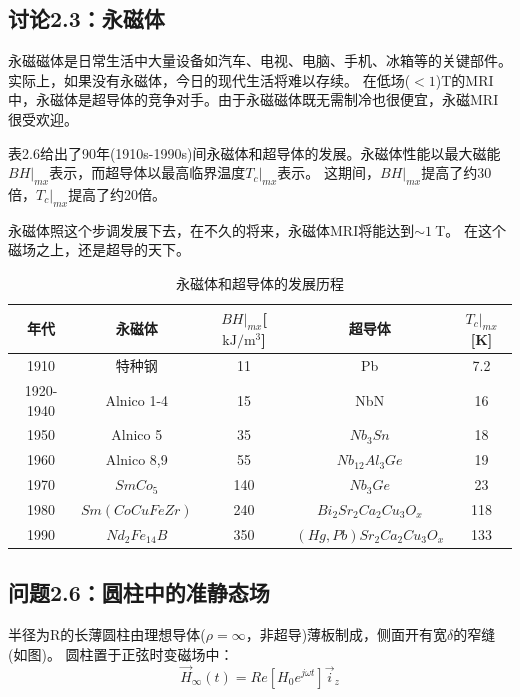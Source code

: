 \subsection{讨论2.3：永磁体}
永磁磁体是日常生活中大量设备如汽车、电视、电脑、手机、冰箱等的关键部件。实际上，如果没有永磁体，今日的现代生活将难以存续。
在低场($<1$)T的MRI中，永磁体是超导体的竞争对手。由于永磁磁体既无需制冷也很便宜，永磁MRI很受欢迎。

表2.6给出了90年(1910s-1990s)间永磁体和超导体的发展。永磁体性能以最大磁能$BH|_{mx}$表示，而超导体以最高临界温度$T_c|_{mx}$表示。
这期间，$BH|_{mx}$提高了约30倍，$T_c|_{mx}$提高了约20倍。

永磁体照这个步调发展下去，在不久的将来，永磁体MRI将能达到$\sim 1\ $T。
在这个磁场之上，还是超导的天下。

\begin{table}[htbp]
\centering
\caption{永磁体和超导体的发展历程}
\label{磁体和超导体的发展}
\begin{tabular}{|c|c|c|c|c|}
\hline
年代        & 永磁体 & $BH|_{mx}$[$\mathrm{kJ/m^3}$] & 超导体 & $T_c|_{mx}$[K]   \\ \hline
1910      &  特种钢   & 11       &  Pb   & 7.2 \\ \hline
1920-1940 &  Alnico 1-4   & 15       &   NbN  & 16  \\ \hline
1950      &   Alnico 5  & 35       &    $Nb_3 Sn$ & 18  \\ \hline
1960      &   Alnico 8,9  & 55       &   $Nb_{12}Al_3 Ge$  &   19  \\ \hline
1970      &   $SmCo_5 $  & 140      &  $Nb_3Ge$   & 23    \\ \hline
1980      &   $Sm(CoCuFeZr)  $& 240      &  $Bi_2 Sr_2 Ca_2 Cu_3 O_x$   & 118 \\ \hline
1990      &  $Nd_2Fe_{14}B$   & 350      & $(Hg, Pb) Sr_2 Ca_2 Cu_3 O_x$    & 133 \\ \hline
\end{tabular}
\end{table}



\subsection{问题2.6：圆柱中的准静态场}
半径为R的长薄圆柱由理想导体($\rho=\infty$，非超导)薄板制成，侧面开有宽$\delta$的窄缝(如图)。
圆柱置于正弦时变磁场中：
\begin{equation}
\vec{H}_\infty(t)=Re[H_0 e^{j\omega t}] \vec{i}_z
\end{equation}

